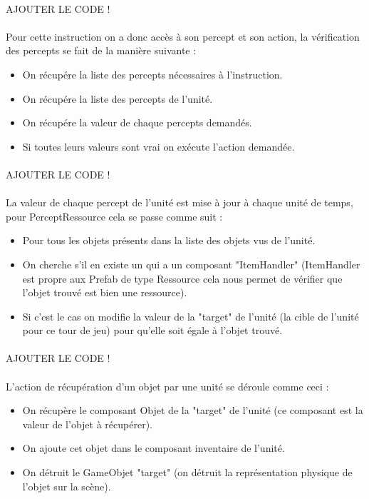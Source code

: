 \documentclass{report}
\begin{document}
\paragraph{}
AJOUTER LE CODE !
\paragraph{}
Pour cette instruction on a donc accès à son percept et son action, la vérification des percepts se fait de la manière suivante :
\begin{itemize}
\item On récupére la liste des percepts nécessaires à l'instruction.
\item On récupére la liste des percepts de l'unité.
\item On récupére la valeur de chaque percepts demandés.
\item Si toutes leurs valeurs sont vrai on exécute l'action demandée.
\end{itemize}
\paragraph{}
AJOUTER LE CODE !
\paragraph{}
La valeur de chaque percept de l'unité est mise à jour à chaque unité de temps, pour PerceptRessource cela se passe comme suit :
\begin{itemize}
\item Pour tous les objets présents dans la liste des objets vus de l'unité.
\item On cherche s'il en existe un qui a un composant "ItemHandler" (ItemHandler est propre aux Prefab de type Ressource cela nous permet de vérifier que l'objet trouvé est bien une ressource).
\item Si c'est le cas on modifie la valeur de la "target" de l'unité (la cible de l'unité pour ce tour de jeu) pour qu'elle soit égale à l'objet trouvé.
\end{itemize}
\paragraph{}
AJOUTER LE CODE !
\paragraph{}
L'action de récupération d'un objet par une unité se déroule comme ceci :
\begin{itemize}
\item On récupère le composant Objet de la "target" de l'unité (ce composant est la valeur de l'objet à récupérer).
\item On ajoute cet objet dans le composant inventaire de l'unité.
\item On détruit le GameObjet "target" (on détruit la représentation physique de l'objet sur la scène).
\end{itemize}
\end{document}
